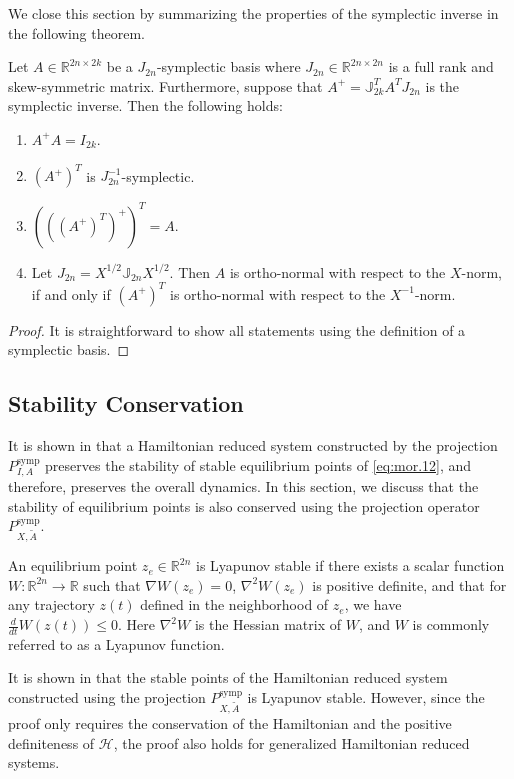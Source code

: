 We close this section by summarizing the properties of the symplectic inverse in the following theorem.
\begin{theorem} \label{thm:2}
Let $A\in \mathbb R^{2n\times 2k}$ be a $J_{2n}$-symplectic basis where $J_{2n}\in\mathbb R^{2n\times 2n}$ is a full rank and skew-symmetric matrix. Furthermore, suppose that $A^{+} = \mathbb{J}_{2k}^T A^T J_{2n}$ is the symplectic inverse. Then the following holds:
\begin{enumerate}
\item $A^+A = I_{2k}$.
\item $(A^+)^T$ is $J_{2n}^{-1}$-symplectic.
\item $\left(\left(\left(A^+\right)^T\right)^+\right)^T = A$.
\item Let $J_{2n}=X^{1/2}\mathbb J_{2n} X^{1/2}$. Then $A$ is ortho-normal with respect to the $X$-norm, if and only if $(A^+)^T$ is ortho-normal with respect to the $X^{-1}$-norm.
\end{enumerate}
\end{theorem}
\begin{proof}
It is straightforward to show all statements using the definition of a symplectic basis.
\end{proof}

\subsection{Stability Conservation} It is shown in \cite{doi:10.1137/140978922,doi:10.1137/17M1111991} that a Hamiltonian reduced system constructed by the projection $P^{\text{symp}}_{I,A}$ preserves the stability of stable equilibrium points of \cref{eq:mor.12}, and therefore, preserves the overall dynamics. In this section, we discuss that the stability of equilibrium points is also conserved using the projection operator $P^{\text{symp}}_{X,\tilde A}$.

\begin{proposition} \label{prop:new1}
\cite{bhatia2002stability} An equilibrium point $z_e\in \mathbb R^{2n}$ is Lyapunov stable if there exists a scalar function $W:\mathbb R^{2n} \to \mathbb R$ such that $\nabla W(z_e) = 0$, $\nabla^2 W(z_e)$ is positive definite, and that for any trajectory $z(t)$ defined in the neighborhood of $z_e$, we have $\frac{d}{dt} W(z(t))\leq 0$. Here $\nabla^2 W$ is the Hessian matrix of $W$, and $W$ is commonly referred to as a Lyapunov function.
\end{proposition}

It is shown in \cite{doi:10.1137/17M1111991} that the stable points of the Hamiltonian reduced system constructed using the projection $P^{\text{symp}}_{X,\tilde A}$ is Lyapunov stable. However, since the proof only requires the conservation of the Hamiltonian and the positive definiteness of $\mathcal H$, the proof also holds for generalized Hamiltonian reduced systems.

